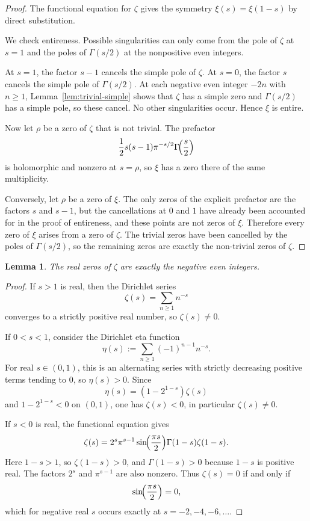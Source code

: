 \documentclass[11pt,a4paper]{article}
\newtheorem{lemma}[theorem]{Lemma}
\theoremstyle{definition}
\theoremstyle{remark}
\begin{document}
\begin{proof}
The functional equation for $\zeta$ gives the symmetry $\xi(s)=\xi(1-s)$ by direct substitution.

We check entireness.  Possible singularities can only come from the pole of $\zeta$ at $s=1$ and the poles of $\Gamma(s/2)$ at the nonpositive even integers.

At $s=1$, the factor $s-1$ cancels the simple pole of $\zeta$.
At $s=0$, the factor $s$ cancels the simple pole of $\Gamma(s/2)$.
At each negative even integer $-2n$ with $n\ge 1$, Lemma~\ref{lem:trivial-simple} shows that $\zeta$ has a simple zero and $\Gamma(s/2)$ has a simple pole, so these cancel.  No other singularities occur.  Hence $\xi$ is entire.

Now let $\rho$ be a zero of $\zeta$ that is not trivial.  The prefactor
\[
\frac12 s(s-1)\pi^{-s/2}\Gamma\!\Bigl(\frac s2\Bigr)
\]
is holomorphic and nonzero at $s=\rho$, so $\xi$ has a zero there of the same multiplicity.

Conversely, let $\rho$ be a zero of $\xi$.  The only zeros of the explicit prefactor are the factors $s$ and $s-1$, but the cancellations at $0$ and $1$ have already been accounted for in the proof of entireness, and these points are not zeros of $\xi$.  Therefore every zero of $\xi$ arises from a zero of $\zeta$.  The trivial zeros have been cancelled by the poles of $\Gamma(s/2)$, so the remaining zeros are exactly the non-trivial zeros of $\zeta$.
\end{proof}

\begin{lemma}\label{lem:real-zeros}
The real zeros of $\zeta$ are exactly the negative even integers.
\end{lemma}

\begin{proof}
If $s>1$ is real, then the Dirichlet series
\[
\zeta(s)=\sum_{n\ge 1} n^{-s}
\]
converges to a strictly positive real number, so $\zeta(s)\ne 0$.

If $0<s<1$, consider the Dirichlet eta function
\[
\eta(s):=\sum_{n\ge1} (-1)^{n-1} n^{-s}.
\]
For real $s\in(0,1)$, this is an alternating series with strictly decreasing positive terms tending to $0$, so $\eta(s)>0$.  Since
\[
\eta(s)=(1-2^{1-s})\zeta(s)
\]
and $1-2^{1-s}<0$ on $(0,1)$, one has $\zeta(s)<0$, in particular $\zeta(s)\ne 0$.

If $s<0$ is real, the functional equation gives
\[
\zeta(s)=2^s\pi^{s-1}\sin\!\Bigl(\frac{\pi s}{2}\Bigr)\Gamma(1-s)\zeta(1-s).
\]
Here $1-s>1$, so $\zeta(1-s)>0$, and $\Gamma(1-s)>0$ because $1-s$ is positive real.  The factors $2^s$ and $\pi^{s-1}$ are also nonzero.  Thus $\zeta(s)=0$ if and only if
\[
\sin\!\Bigl(\frac{\pi s}{2}\Bigr)=0,
\]
which for negative real $s$ occurs exactly at $s=-2,-4,-6,\dots$.
\end{proof}
\end{document}
